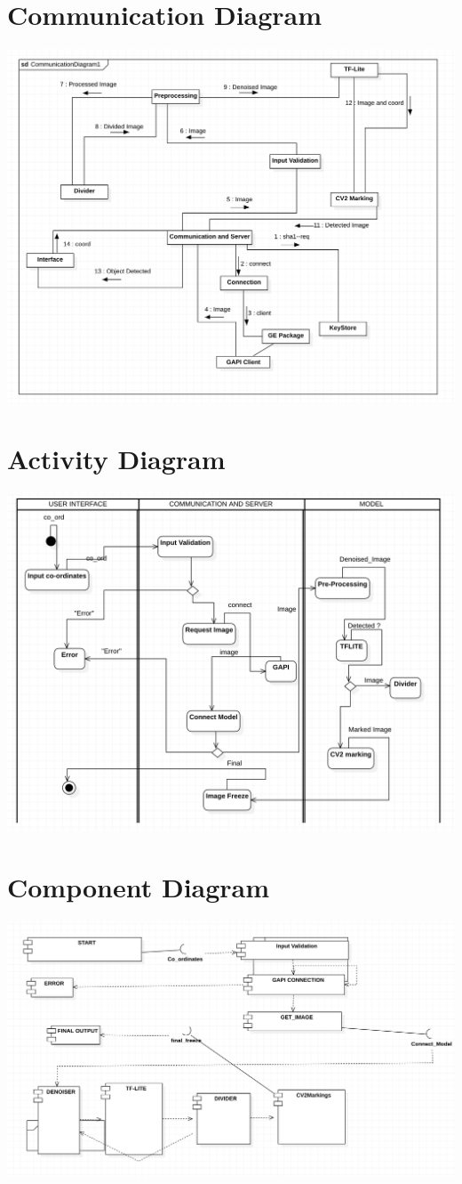 \section{Communication Diagram}
\includegraphics[scale=0.6]{images/com.png}
\section{Activity Diagram}
\includegraphics[scale=0.6]{images/activity.png}
\section{Component Diagram}
\includegraphics[scale=0.4]{images/comp.png}
